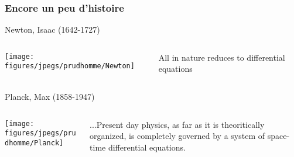 \begin{frame}
  \frametitle{Encore un peu d'histoire}

  \begin{block}{Newton, Isaac (1642-1727) }
    \begin{columns}[c]
      \begin{column}{.3\textwidth}
        \texttt{[image: figures/jpegs/prudhomme/Newton]}
      \end{column}
      \begin{column}{.55\textwidth}
        All in nature reduces to differential equations
      \end{column}
    \end{columns}

  \end{block}

  \begin{block}{Planck, Max (1858-1947)}
    \begin{columns}[c]
      \begin{column}{.3\textwidth}
        \texttt{[image: figures/jpegs/prudhomme/Planck]}
      \end{column}
      \begin{column}{.55\textwidth}
        ...Present day physics, as far as it is theoritically organized,
        is completely governed by a system of space-time differential
        equations.
      \end{column}
    \end{columns}
  \end{block}
 \end{frame}
